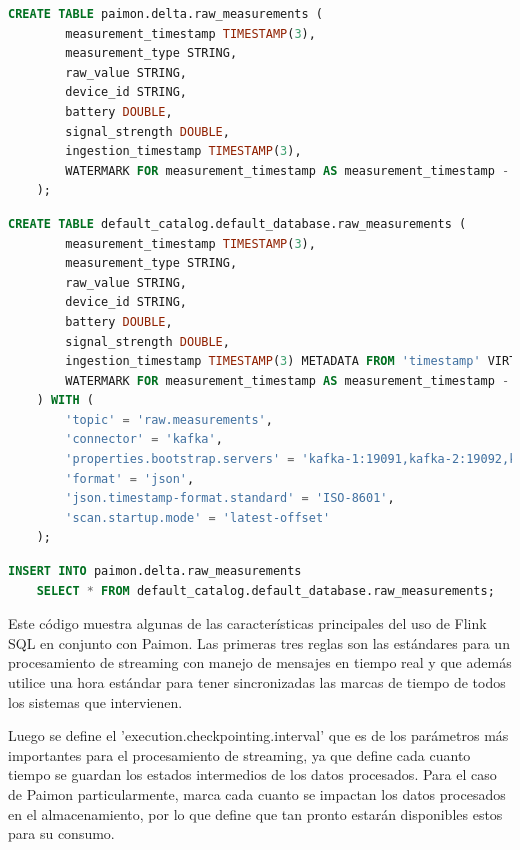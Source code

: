 \begin{lstlisting}[language=sql]
    CREATE TABLE paimon.delta.raw_measurements (
        measurement_timestamp TIMESTAMP(3),
        measurement_type STRING,
        raw_value STRING,
        device_id STRING,
        battery DOUBLE,
        signal_strength DOUBLE,
        ingestion_timestamp TIMESTAMP(3),
        WATERMARK FOR measurement_timestamp AS measurement_timestamp - INTERVAL '10' SECONDS
    );
\end{lstlisting}

\newpage

\begin{lstlisting}[language=sql]
    CREATE TABLE default_catalog.default_database.raw_measurements (
        measurement_timestamp TIMESTAMP(3),
        measurement_type STRING,
        raw_value STRING,
        device_id STRING,
        battery DOUBLE,
        signal_strength DOUBLE,
        ingestion_timestamp TIMESTAMP(3) METADATA FROM 'timestamp' VIRTUAL,
        WATERMARK FOR measurement_timestamp AS measurement_timestamp - INTERVAL '10' SECONDS
    ) WITH (
        'topic' = 'raw.measurements',
        'connector' = 'kafka',
        'properties.bootstrap.servers' = 'kafka-1:19091,kafka-2:19092,kafka-3:19093',
        'format' = 'json',
        'json.timestamp-format.standard' = 'ISO-8601',
        'scan.startup.mode' = 'latest-offset'
    );
\end{lstlisting}

\begin{lstlisting}[language=sql]
    INSERT INTO paimon.delta.raw_measurements
    SELECT * FROM default_catalog.default_database.raw_measurements;
\end{lstlisting}

Este código muestra algunas de las características principales del uso de Flink SQL en conjunto con Paimon.
Las primeras tres reglas son las estándares para un procesamiento de streaming 
con manejo de mensajes en tiempo real y que además utilice una hora estándar para tener sincronizadas
las marcas de tiempo de todos los sistemas que intervienen.\newline

Luego se define el 'execution.checkpointing.interval' que es de los parámetros más importantes para el procesamiento de streaming,
ya que define cada cuanto tiempo se guardan los estados intermedios de los datos procesados.
Para el caso de Paimon particularmente, marca cada cuanto se impactan los datos procesados en el almacenamiento,
por lo que define que tan pronto estarán disponibles estos para su consumo.\newline

